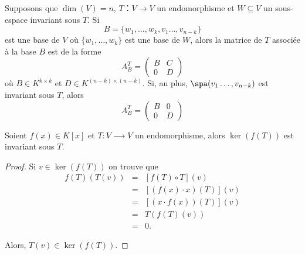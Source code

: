 \begin{remark}
  \label{rem:9}
Supposons que $\dim(V) = n$, $Τ ： V → V$ un endomorphisme et $W ⊆ V$ un sous-espace invariant sous $T$. Si
\begin{displaymath}
  B = \{w_1,\dots,w_k,v_1\dots,v_{n-k}\} 
\end{displaymath}
est une base de $V$ où $\{w_1,\dots,w_k\}$ est une base de $W$, alors la matrice de $T$ associée à la base $B$ est de la forme 
\begin{displaymath}
  A_B^T =
  \begin{pmatrix}
    B & C \\
    0 & D     
  \end{pmatrix}
\end{displaymath}
où $B ∈ K^{k×k}$ et $D ∈ K^{(n-k)×(n-k)}$. Si, au plus, $\spa(v_1\dots,v_{n-k})$ est invariant sous $T$, alors
\begin{displaymath}
  A_B^T =
  \begin{pmatrix}
    B & 0 \\
    0 & D     
  \end{pmatrix}
\end{displaymath}
\end{remark}

\begin{lemma}
  \label{lem:20}
  Soient $f(x) ∈ K[x]$ et $T:V ⟶  V$ un endomorphisme,  alors $\ker(f(T))$ est invariant sous $T$. 
\end{lemma}


\begin{proof}
  Si $v ∈ \ker(f(T))$ on trouve que
  \begin{eqnarray*}
    f(T)(T(v))  & = & \left[f(T) \circ T \right](v)\\ 
                & = &     \left[(f(x) ⋅x)(T)\right] (v) \\
                & = & \left[(x ⋅ f(x))(T) \right] (v) \\
                &=& T (f(T)(v)) \\
                &=& 0.
  \end{eqnarray*}

  Alors, $T(v) ∈ \ker(f(T))$. 
\end{proof}



